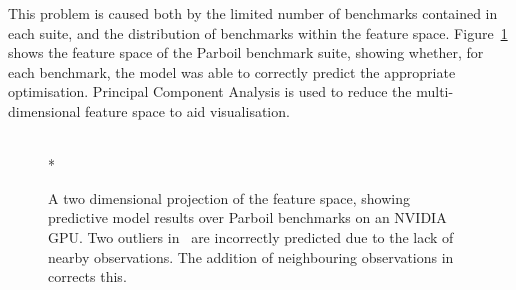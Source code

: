 \newpage
This problem is caused both by the limited number of benchmarks contained in each suite, and the distribution of benchmarks within the feature space. Figure~\ref{fig:pca-benchmarks} shows the feature space of the Parboil benchmark suite, showing whether, for each benchmark, the model was able to correctly predict the appropriate optimisation. Principal Component Analysis is used to reduce the multi-dimensional feature space to aid visualisation.

\begin{figure}
  \centering
  \\*
  \caption[Identifying and correcting outliers in a benchmark suite]{%
    A two dimensional projection of the \citeauthor{Grewe2013} feature space, showing predictive model results over Parboil benchmarks on an NVIDIA GPU. Two outliers in~\protect{} are incorrectly predicted due to the lack of nearby observations. The addition of neighbouring observations in~\protect{} corrects this.%
  }%
  \label{fig:pca-benchmarks}
\end{figure}


